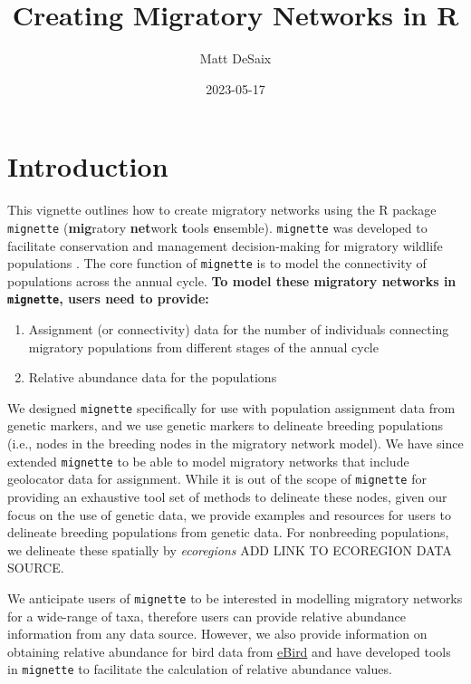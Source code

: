\documentclass[
]{book}
\title{Creating Migratory Networks in R}
\author{Matt DeSaix}
\date{2023-05-17}
\providecommand{\tightlist}{%
  \setlength{\itemsep}{0pt}\setlength{\parskip}{0pt}}
\begin{document}
\maketitle

{
\setcounter{tocdepth}{1}
\tableofcontents
}
\hypertarget{introduction}{%
\chapter{Introduction}\label{introduction}}

This vignette outlines how to create migratory networks using the R package \texttt{mignette} (\textbf{mig}ratory \textbf{net}work \textbf{t}ools \textbf{e}nsemble). \texttt{mignette} was developed to facilitate conservation and management decision-making for migratory wildlife populations \citep[\citet{taylor2010population}]{ruegg2020genoscape}. The core function of \texttt{mignette} is to model the connectivity of populations across the annual cycle. \textbf{To model these migratory networks in \texttt{mignette}, users need to provide:}

\begin{enumerate}
\def\labelenumi{\arabic{enumi}.}
\tightlist
\item
  Assignment (or connectivity) data for the number of individuals connecting migratory populations from different stages of the annual cycle
\item
  Relative abundance data for the populations
\end{enumerate}

We designed \texttt{mignette} specifically for use with population assignment data from genetic markers, and we use genetic markers to delineate breeding populations (i.e., nodes in the breeding nodes in the migratory network model). We have since extended \texttt{mignette} to be able to model migratory networks that include geolocator data for assignment. While it is out of the scope of \texttt{mignette} for providing an exhaustive tool set of methods to delineate these nodes, given our focus on the use of genetic data, we provide examples and resources for users to delineate breeding populations from genetic data. For nonbreeding populations, we delineate these spatially by \emph{ecoregions} ADD LINK TO ECOREGION DATA SOURCE.

We anticipate users of \texttt{mignette} to be interested in modelling migratory networks for a wide-range of taxa, therefore users can provide relative abundance information from any data source. However, we also provide information on obtaining relative abundance for bird data from \href{https://ebird.org/science/status-and-trends}{eBird} and have developed tools in \texttt{mignette} to facilitate the calculation of relative abundance values.
\end{document}
